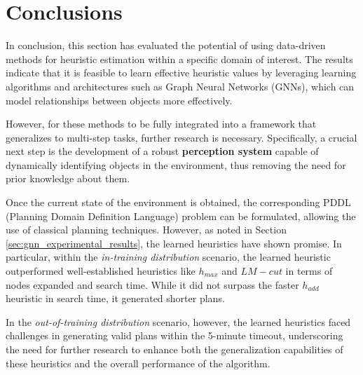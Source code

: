 \section{Conclusions}
\label{sec:gnn_conclusions}

In conclusion, this section has evaluated the potential of using data-driven methods for heuristic estimation within a specific domain of interest. The results indicate that it is feasible to learn effective heuristic values by leveraging learning algorithms and architectures such as Graph Neural Networks (GNNs), which can model relationships between objects more effectively.

However, for these methods to be fully integrated into a framework that generalizes to multi-step tasks, further research is necessary. Specifically, a crucial next step is the development of a robust \textbf{perception system} capable of dynamically identifying objects in the environment, thus removing the need for prior knowledge about them.

Once the current state of the environment is obtained, the corresponding PDDL (Planning Domain Definition Language) problem can be formulated, allowing the use of classical planning techniques. However, as noted in Section \ref{sec:gnn_experimental_results}, the learned heuristics have shown promise. In particular, within the \textit{in-training distribution} scenario, the learned heuristic \\ outperformed well-established heuristics like $h_{max}$ and $LM-cut$ in terms of nodes expanded and search time. While it did not surpass the faster $h_{add}$ heuristic in search time, it generated shorter plans.

In the \textit{out-of-training distribution} scenario, however, the learned heuristics faced challenges in generating valid plans within the 5-minute timeout, underscoring the need for further research to enhance both the generalization capabilities of these heuristics and the overall performance of the algorithm.
